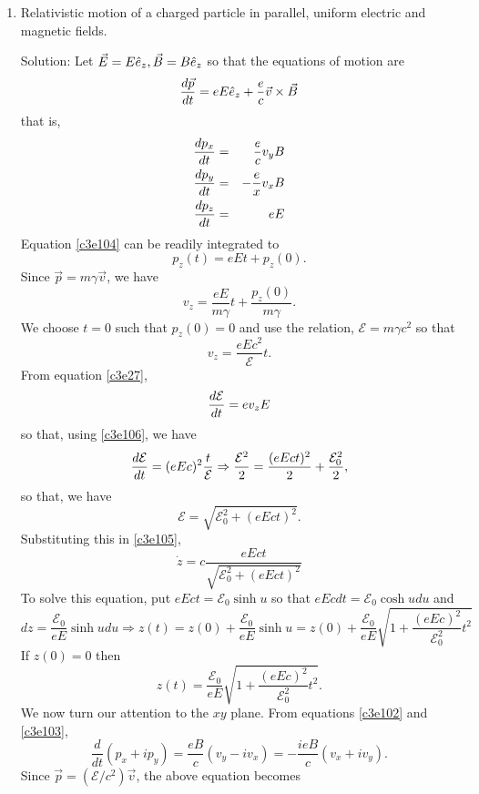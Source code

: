 \begin{enumerate}
\item Relativistic motion of a charged particle in parallel, uniform electric
and magnetic fields.
\item[Solution:] Let $\vec{E} = E\hat{e}_{z}, \vec{B} = B\hat{e}_{z}$ so that the equations
of motion are
\[
\frac{d{\vec{p}}}{d{t}} = eE\hat{e}_{z} + \frac{e}{c}\vec{v}\times\vec{B}
\]
that is,
\begin{eqnarray}
\frac{d{p_x}}{d{t}} &=& \frac{e}{c}v_yB \label{c3e102} \\
\frac{d{p_y}}{d{t}} &=& -\frac{e}{x}v_xB \label{c3e103} \\
\frac{d{p_z}}{d{t}} &=& eE \label{c3e104} 
\end{eqnarray}
Equation \eqref{c3e104} can be readily integrated to
\[
p_z(t) = eEt + p_z(0).
\]
Since $\vec{p} = m\gamma\vec{v}$, we have
\begin{equation}\label{c3e105} 
v_z = \frac{eE}{m\gamma}t + \frac{p_z(0)}{m\gamma}.
\end{equation}
We choose $t = 0$ such that $p_z(0) = 0$ and use the relation, 
$\mathcal{E} = m\gamma c^2$ so that
\begin{equation}\label{c3e106}
v_z = \frac{eEc^2}{\mathcal{E}}t.
\end{equation} 
From equation \eqref{c3e27},
\[
\frac{d{\mathcal{E}}}{d{t}} = ev_zE
\]
so that, using \eqref{c3e106}, we have 
\[
\frac{d{\mathcal{E}}}{d{t}} = (eEc)^2\frac{t}{\mathcal{E}} \Rightarrow
\frac{\mathcal{E}^2}{2} = \frac{(eEct)^2}{2} + \frac{\mathcal{E}_0^2}{2},
\]
so that, we have
\begin{equation}\label{c3e107}
\mathcal{E} = \sqrt{\mathcal{E}_0^2 + (eEct)^2}.
\end{equation}
Substituting this in \eqref{c3e105},
\[
\dot{z} = c\frac{eEct}{\sqrt{\mathcal{E}_0^2 + (eEct)^2}}
\]
To solve this equation, put $eEct = \mathcal{E}_0\sinh u$ so that $eEcdt = 
\mathcal{E}_0\cosh udu$ and
\[
dz = \frac{\mathcal{E}_0}{eE}\sinh udu \Rightarrow
z(t) = z(0) + \frac{\mathcal{E}_0}{eE}\sinh u = z(0) + \frac{\mathcal{E}_0}{eE}
\sqrt{1 + \frac{(eEc)^2}{\mathcal{E}_0^2}t^2}
\]
If $z(0) = 0$ then 
\begin{equation}\label{c3e108}
z(t) = \frac{\mathcal{E}_0}{eE}\sqrt{1 + \frac{(eEc)^2}{\mathcal{E}_0^2}t^2}.
\end{equation}
We now turn our attention to the $xy$ plane. From equations \eqref{c3e102} and
\eqref{c3e103},
\[
\frac{d}{dt}(p_x + ip_y) = \frac{eB}{c}(v_y - iv_x) = -\frac{ieB}{c}(v_x + iv_y).
\]
Since $\vec{p} = (\mathcal{E}/c^2)\vec{v}$, the above equation becomes
\begin{equation}\label{c3e109}

\end{equation}
\end{enumerate}
